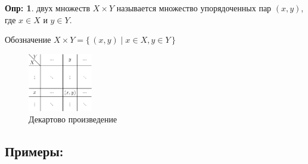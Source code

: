 \documentclass[12pt]{article}
\theoremstyle{definition}
\newtheorem{defn}{Опр:}
\begin{document}
\begin{defn}
	 двух множеств $X \times Y$ называется множество упорядоченных пар $(x,y)$, где $x \in X$ и $y \in Y$. 
\end{defn}

Обозначение $X \times Y = \{\,(x,y) \mid x \in X, y \in Y \,\}$

\begin{figure}[H]
	\centering
	\includegraphics[width=0.25\textwidth]{2_1.eps}
	\caption{Декартово произведение}
	\label{fig:2_1}
\end{figure}

\subsection*{Примеры:}
\end{document}
